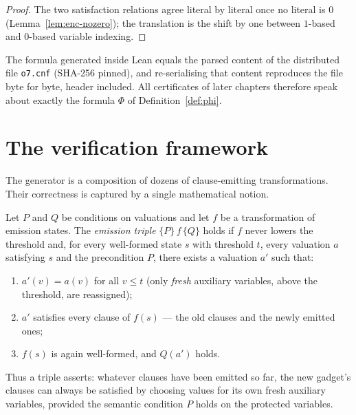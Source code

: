 \begin{proof}\leanok
The two satisfaction relations agree literal by literal once no literal is
$0$ (Lemma~\ref{lem:enc-nozero}); the translation is the shift by one between
$1$-based and $0$-based variable indexing.
\end{proof}

\begin{fact}\label{fact:bytes}
The formula generated inside Lean equals the parsed content of the
distributed file \texttt{o7.cnf} (SHA-256 pinned), and re-serialising that
content reproduces the file byte for byte, header included.  All certificates
of later chapters therefore speak about exactly the formula $\Phi$ of
Definition~\ref{def:phi}.
\leanok
{}
\end{fact}

\section{The verification framework}\label{ssec:enc-framework}

The generator is a composition of dozens of clause-emitting transformations.
Their correctness is captured by a single mathematical notion.

\begin{definition}\label{def:enc-gtrip}
Let $P$ and $Q$ be conditions on valuations and let $f$ be a transformation
of emission states.  The \emph{emission triple} $\{P\}\,f\,\{Q\}$ holds if
$f$ never lowers the threshold and, for every well-formed state $s$ with
threshold $t$, every valuation $a$ satisfying $s$ and the precondition $P$,
there exists a valuation $a'$ such that:
\begin{enumerate}
\item $a'(v) = a(v)$ for all $v \leq t$ (only \emph{fresh} auxiliary
variables, above the threshold, are reassigned);
\item $a'$ satisfies every clause of $f(s)$ --- the old clauses and the newly
emitted ones;
\item $f(s)$ is again well-formed, and $Q(a')$ holds.
\end{enumerate}
Thus a triple asserts: whatever clauses have been emitted so far, the new
gadget's clauses can always be satisfied by choosing values for its own fresh
auxiliary variables, provided the semantic condition $P$ holds on the
protected variables.
\leanok
{}
\end{definition}

